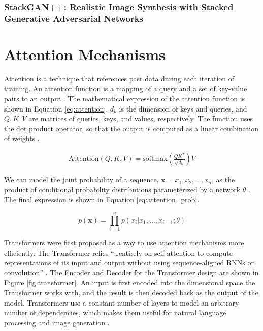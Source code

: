 \documentclass[letterpaper]{article} %
\begin{document}
\subsubsection{StackGAN++: Realistic Image Synthesis
with Stacked Generative Adversarial Networks}
\cite{stackgan++}

\section{Attention Mechanisms}
Attention is a technique that references past data during each iteration of 
training.
An attention function is a mapping of a query and a
set of key-value pairs to an output \cite{attention_need}.
The mathematical expression of the attention function is shown in
Equation \ref{eq:attention}.
$d_k$ is the dimension of keys and queries, and
$Q,K,V$ are matrices of queries, keys, and values, respectively.
The function uses the dot product operator, so that the output is computed as
a linear combination of weights \cite{attention_need}.

\begin{equation}
\label{eq:attention}
\begin{split}
\text{Attention}(Q,K,V) = \text{softmax}(\frac{QK^T}{\sqrt{d_k}})V
\end{split}
\end{equation}

We can model the joint probability of a sequence,
$\mathbf{x}={x_1,x_2,\dots,x_n}$,
as the product of conditional
probability distributions parameterized by a network $\theta$
\cite{generative_transformers}.
The final expression is shown in Equation \ref{eq:attention_prob}.

\begin{equation}
\label{eq:attention_prob}
p(\mathbf{x}) = \prod_{i=1}^{n}p(x_i|x_1,\dots,x_{i-1};\theta)
\end{equation}

Transformers were first proposed
as a way to use attention mechanisms more efficiently.
The Transformer relies
``\dots entirely on self-attention to compute representations of its input and 
output
without using sequence-aligned RNNs or convolution''
\cite{attention_need}.
The Encoder and Decoder for the Transformer design
are shown in Figure \ref{fig:transformer}.
An input is first encoded into the dimensional space
the Transformer works with,
and the result is then decoded back as the output of the model.
Transformers use a constant number of layers to model an arbitrary number of 
dependencies, which makes them useful for natural language processing and 
image 
generation
\cite{generative_transformers}.
\end{document}
